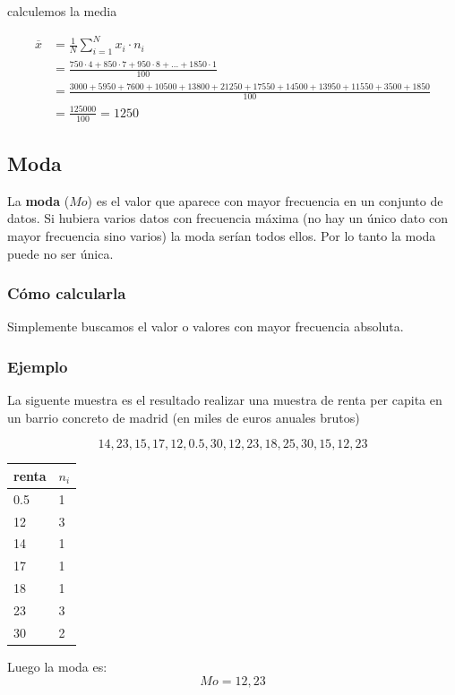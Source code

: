\documentclass[
]{article}
\begin{document}
calculemos la media

\begin{align*}
\overline x &= \frac{1}{N}\sum^{N}_{i=1} x_i  \cdot n_i\\
&= \frac{750  \cdot  4 + 850  \cdot  7 + 950 \cdot 8 +  \ldots + 1850 \cdot  1}{100}\\
& = \frac{3000  + 5950  + 7600  + 10500 + 13800 + 21250 + 17550 + 14500 + 13950 + 11550 + 3500  + 1850}{100}\\
&=\frac{125000}{100}=1250
\end{align*}

\hypertarget{moda}{%
\subsection{Moda}\label{moda}}

La \textbf{moda} (\(Mo\)) es el valor que aparece con mayor frecuencia
en un conjunto de datos. Si hubiera varios datos con frecuencia máxima
(no hay un único dato con mayor frecuencia sino varios) la moda serían
todos ellos. Por lo tanto la moda puede no ser única.

\hypertarget{cuxf3mo-calcularla-1}{%
\subsubsection{Cómo calcularla}\label{cuxf3mo-calcularla-1}}

Simplemente buscamos el valor o valores con mayor frecuencia absoluta.

\hypertarget{ejemplo-2}{%
\subsubsection{Ejemplo}\label{ejemplo-2}}

La siguente muestra es el resultado realizar una muestra de renta per
capita en un barrio concreto de madrid (en miles de euros anuales
brutos)

\[ 14, 23, 15, 17,12, 0.5, 30, 12, 23, 18, 25, 30, 15, 12, 23 \]

\begin{longtable}[]{@{}ll@{}}
\toprule
renta & \(n_i\)\tabularnewline
\midrule
\endhead
0.5 & 1\tabularnewline
12 & 3\tabularnewline
14 & 1\tabularnewline
17 & 1\tabularnewline
18 & 1\tabularnewline
23 & 3\tabularnewline
30 & 2\tabularnewline
\bottomrule
\end{longtable}

Luego la moda es: \[Mo = 12, 23\]
\end{document}
